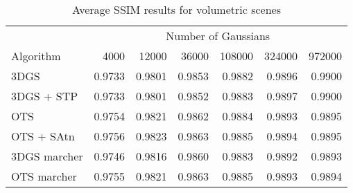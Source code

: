 \begin{table}[h!]
\centering
\caption{Average SSIM results for volumetric scenes}
\label{tab:ssim_avg_interest}
\begin{tabular}{lrrrrrr}
\toprule
& \multicolumn{6}{c}{Number of Gaussians} \\
Algorithm & 4000 & 12000 & 36000 & 108000 & 324000 & 972000 \\

\midrule
3DGS & 0.9733 & 0.9801 & 0.9853 & 0.9882 & 0.9896 & 0.9900 \\
3DGS + STP & 0.9733 & 0.9801 & 0.9852 & 0.9883 & 0.9897 & 0.9900 \\
OTS & 0.9754 & 0.9821 & 0.9862 & 0.9884 & 0.9893 & 0.9895 \\
OTS + SAtn & 0.9756 & 0.9823 & 0.9863 & 0.9885 & 0.9894 & 0.9895 \\
3DGS marcher & 0.9746 & 0.9816 & 0.9860 & 0.9883 & 0.9892 & 0.9893 \\
OTS marcher & 0.9755 & 0.9821 & 0.9863 & 0.9885 & 0.9893 & 0.9894 \\
\bottomrule
\end{tabular}
\end{table}
